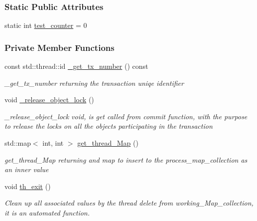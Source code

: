 \subsubsection*{Static Public Attributes}
\begin{DoxyCompactItemize}
\item 
static int \hyperlink{class_t_x_a25838234aab99ae891a90eb8623a8b3c_a25838234aab99ae891a90eb8623a8b3c}{test\+\_\+counter} = 0
\end{DoxyCompactItemize}
\subsubsection*{Private Member Functions}
\begin{DoxyCompactItemize}
\item 
const std\+::thread\+::id \hyperlink{class_t_x_a9eba04944d449285905b60ec47223cff_a9eba04944d449285905b60ec47223cff}{\+\_\+get\+\_\+tx\+\_\+number} () const 
\begin{DoxyCompactList}\small\item\em \+\_\+get\+\_\+tx\+\_\+number returning the transaction uniqe identifier \end{DoxyCompactList}\item 
void \hyperlink{class_t_x_a4c13d2015dc15d0f788fa9a1413f0463_a4c13d2015dc15d0f788fa9a1413f0463}{\+\_\+release\+\_\+object\+\_\+lock} ()
\begin{DoxyCompactList}\small\item\em \+\_\+release\+\_\+object\+\_\+lock void, is get called from commit function, with the purpose to release the locks on all the objects participating in the transaction \end{DoxyCompactList}\item 
std\+::map$<$ int, int $>$ \hyperlink{class_t_x_a3f5671423cb7b9f9c98f8a25f2a4b545_a3f5671423cb7b9f9c98f8a25f2a4b545}{get\+\_\+thread\+\_\+\+Map} ()
\begin{DoxyCompactList}\small\item\em get\+\_\+thread\+\_\+\+Map returning and map to insert to the process\+\_\+map\+\_\+collection as an inner value \end{DoxyCompactList}\item 
void \hyperlink{class_t_x_ae045534c4a9d39bd5c6ea2a39a372a79_ae045534c4a9d39bd5c6ea2a39a372a79}{th\+\_\+exit} ()
\begin{DoxyCompactList}\small\item\em Clean up all associated values by the thread delete from working\+\_\+\+Map\+\_\+collection, it is an automated function. \end{DoxyCompactList}\end{DoxyCompactItemize}
